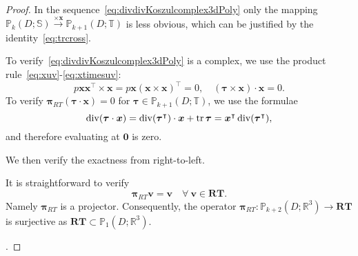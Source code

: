 \begin{proof}
In the sequence~\eqref{eq:divdivKoszulcomplex3dPoly} only the mapping $\mathbb P_k(D; \mathbb S) \stackrel{\times \boldsymbol x}{\longrightarrow}  \mathbb P_{k+1}(D; \mathbb T)$ is less obvious, which can be justified by the identity~\eqref{eq:trcross}. 

To verify~\eqref{eq:divdivKoszulcomplex3dPoly} is a complex, we use the product rule~\eqref{eq:xuv}-\eqref{eq:xtimesuv}:
$$
p \boldsymbol x\boldsymbol x^{\intercal} \times \boldsymbol x = p \boldsymbol x(\boldsymbol x \times \boldsymbol x )^{\intercal} = 0, \quad (\boldsymbol\tau\times\boldsymbol x)\cdot \boldsymbol x = 0.
$$
To verify $\boldsymbol \pi_{RT}(\boldsymbol \tau \cdot \boldsymbol x) = 0$ for $\boldsymbol \tau \in \mathbb P_{k+1}(D; \mathbb T)$, we use the formulae
\begin{equation}\label{eq:divtaux}
\operatorname{div}(\boldsymbol \tau\cdot \boldsymbol x)=\operatorname{div}(\boldsymbol\tau^{\intercal})\cdot \boldsymbol x + \operatorname*{tr}\boldsymbol\tau = \boldsymbol x^{\intercal}\operatorname{div}(\boldsymbol\tau^{\intercal}),
\end{equation}
and therefore evaluating at $\boldsymbol 0$ is zero. 


We then verify the exactness from right-to-left.

\medskip
{} 

It is straightforward to verify
\begin{equation}\label{eq:piRTprop}
\boldsymbol \pi_{RT}\boldsymbol  v=\boldsymbol  v\quad \forall~\boldsymbol  v\in\boldsymbol{RT}.
\end{equation}
Namely $\boldsymbol \pi_{RT}$ is a projector. Consequently, the operator $\boldsymbol \pi_{RT}: \mathbb P_{k+2}(D; \mathbb R^3)\to\boldsymbol {RT}$ is surjective as $\boldsymbol {RT}\subset \mathbb P_{1}(D; \mathbb R^3)$. 

\medskip
{}. 


\end{proof}

